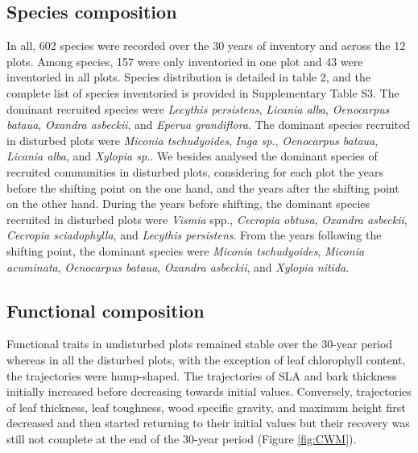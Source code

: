 \documentclass[fleqn,10pt]{ArtEcoFoG} %
\begin{document}
\hypertarget{species-composition}{%
\subsection{Species composition}\label{species-composition}}

In all, 602 species were recorded over the 30 years of inventory and across the 12 plots. Among species, 157 were only inventoried in one plot and 43 were inventoried in all plots.
Species distribution is detailed in table 2, and the complete list of species inventoried is provided in Supplementary Table S3. The dominant recruited species were \emph{Lecythis persistens}, \emph{Licania alba}, \emph{Oenocarpus bataua}, \emph{Oxandra asbeckii}, and \emph{Eperua grandiflora}.
The dominant species recruited in disturbed plots were \emph{Miconia tschudyoides}, \emph{Inga sp.}, \emph{Oenocarpus bataua}, \emph{Licania alba}, and \emph{Xylopia sp.}.
We besides analysed the dominant species of recruited communities in disturbed plots, considering for each plot the years before the shifting point on the one hand, and the years after the shifting point on the other hand.
During the years before shifting, the dominant species recruited in disturbed plots were \emph{Vismia} spp., \emph{Cecropia obtusa}, \emph{Oxandra asbeckii}, \emph{Cecropia sciadophylla}, and \emph{Lecythis persistens}. From the years following the shifting point, the dominant species were \emph{Miconia tschudyoides}, \emph{Miconia acuminata}, \emph{Oenocarpus bataua}, \emph{Oxandra asbeckii}, and \emph{Xylopia nitida}.

\hypertarget{functional-composition}{%
\subsection{Functional composition}\label{functional-composition}}

Functional traits in undisturbed plots remained stable over the 30-year period whereas in all the disturbed plots, with the exception of leaf chlorophyll content, the trajectories were hump-shaped. The trajectories of SLA and bark thickness initially increased before decreasing towards initial values. Conversely, trajectories of leaf thickness, leaf toughness, wood specific gravity, and maximum height first decreased and then started returning to their initial values but their recovery was still not complete at the end of the 30-year period (Figure \ref{fig:CWM}).
\end{document}
